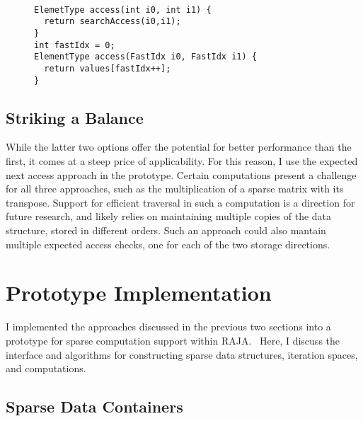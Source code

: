 \begin{figure}
\begin{lstlisting}[caption={Reference implementation for the Specialized Index Types approach.}, label=specializedIndexImpl]

ElemetType access(int i0, int i1) {
  return searchAccess(i0,i1);
}
int fastIdx = 0;
ElementType access(FastIdx i0, FastIdx i1) {
  return values[fastIdx++];
}
\end{lstlisting}
\end{figure}

\subsection{Striking a Balance}
While the latter two options offer the potential for better performance than the first, it comes at a steep price of applicability.
For this reason, I use the expected next access approach in the prototype.
Certain computations present a challenge for all three approaches, such as the multiplication of a sparse matrix with its transpose.
Support for efficient traversal in such a computation is a direction for future research, and likely relies on maintaining multiple copies of the data structure, stored in different orders.
Such an approach could also mantain multiple expected access checks, one for each of the two storage directions.

\section{Prototype Implementation}

I implemented the approaches discussed in the previous two sections into a prototype for sparse computation support within RAJA.~
Here, I discuss the interface and algorithms for constructing sparse data structures, iteration spaces, and computations.

\subsection{Sparse Data Containers}

